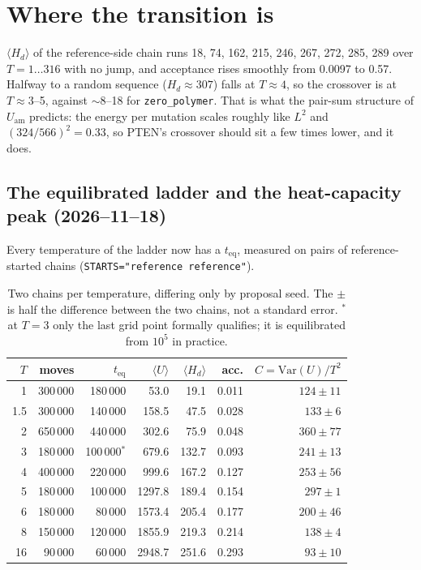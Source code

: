 \documentclass[11pt,a4paper]{article}
\newcommand{\Hd}{H_d}
\newcommand{\file}[1]{\texttt{#1}}
\newcommand{\Uam}{U_{\mathrm{am}}}
\begin{document}
\section{Where the transition is}

$\langle \Hd\rangle$ of the reference-side chain runs 18, 74, 162, 215, 246,
267, 272, 285, 289 over $T=1\ldots316$ with no jump, and acceptance rises
smoothly from 0.0097 to 0.57. Halfway to a random sequence
($\Hd \approx 307$) falls at $T \approx 4$, so the crossover is at
$T \approx 3$--5, against ${\sim}8$--18 for \file{zero\_polymer}. That is what
the pair-sum structure of $\Uam$ predicts: the energy per mutation scales
roughly like $L^2$ and $(324/566)^2 = 0.33$, so PTEN's crossover should sit a
few times lower, and it does.


\subsection{The equilibrated ladder and the heat-capacity peak (2026--11--18)}

Every temperature of the ladder now has a $t_{\mathrm{eq}}$, measured on pairs
of reference-started chains (\texttt{STARTS="reference reference"}).

\begin{table}[h]
\centering
\small
\begin{tabular}{rrrrrrr}
\toprule
$T$ & moves & $t_{\mathrm{eq}}$ & $\langle U\rangle$ & $\langle \Hd\rangle$ & acc. & $C = \mathrm{Var}(U)/T^2$ \\
\midrule
1    & 300\,000 & 180\,000 &   53.0 &  19.1 & 0.011 & $124 \pm 11$ \\
1.5  & 300\,000 & 140\,000 &  158.5 &  47.5 & 0.028 & $133 \pm 6$ \\
2    & 650\,000 & 440\,000 &  302.6 &  75.9 & 0.048 & $360 \pm 77$ \\
3    & 180\,000 & 100\,000$^{*}$ &  679.6 & 132.7 & 0.093 & $241 \pm 13$ \\
4    & 400\,000 & 220\,000 &  999.6 & 167.2 & 0.127 & $253 \pm 56$ \\
5    & 180\,000 & 100\,000 & 1297.8 & 189.4 & 0.154 & $297 \pm 1$ \\
6    & 180\,000 &  80\,000 & 1573.4 & 205.4 & 0.177 & $200 \pm 46$ \\
8    & 150\,000 & 120\,000 & 1855.9 & 219.3 & 0.214 & $138 \pm 4$ \\
16   &  90\,000 &  60\,000 & 2948.7 & 251.6 & 0.293 & $93 \pm 10$ \\
\bottomrule
\end{tabular}
\caption{Two chains per temperature, differing only by proposal seed. The
$\pm$ is half the difference between the two chains, not a standard error.
$^{*}$ at $T=3$ only the last grid point formally qualifies; it is
equilibrated from $10^5$ in practice.}
\end{table}
\end{document}
